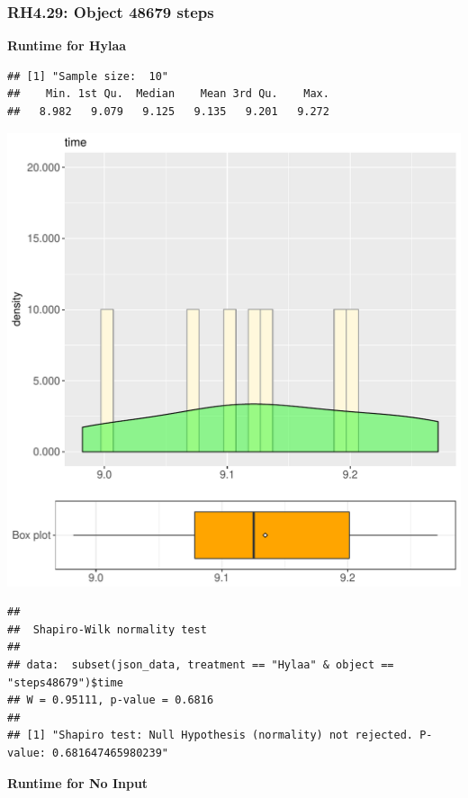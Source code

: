 \documentclass{article}\usepackage[]{graphicx}\usepackage[]{color}
\makeatletter
\def\maxwidth{ %
  \ifdim\Gin@nat@width>\linewidth
    \linewidth
  \else
    \Gin@nat@width
  \fi
}
\newenvironment{kframe}{%
 \def\at@end@of@kframe{}%
 \ifinner\ifhmode%
  \def\at@end@of@kframe{\end{minipage}}%
  \begin{minipage}{\columnwidth}%
 \fi\fi%
 \def\FrameCommand##1{\hskip\@totalleftmargin \hskip-\fboxsep
 \colorbox{shadecolor}{##1}\hskip-\fboxsep
     \hskip-\linewidth \hskip-\@totalleftmargin \hskip\columnwidth}%
 \MakeFramed {\advance\hsize-\width
   \@totalleftmargin\z@ \linewidth\hsize
   \@setminipage}}%
 {\par\unskip\endMakeFramed%
 \at@end@of@kframe}
\newenvironment{knitrout}{}{} %
\makeatother
\begin{document}
\subsubsection{RH4.29: Object 48679 steps}

 \textbf{Runtime for Hylaa}
\begin{knitrout}
\color{fgcolor}\begin{kframe}
\begin{verbatim}
## [1] "Sample size:  10"
##    Min. 1st Qu.  Median    Mean 3rd Qu.    Max. 
##   8.982   9.079   9.125   9.135   9.201   9.272
\end{verbatim}
\end{kframe}
\includegraphics[width=\maxwidth]{figure/RH4_Hylaa_steps48679-1} 
\begin{kframe}\begin{verbatim}
## 
## 	Shapiro-Wilk normality test
## 
## data:  subset(json_data, treatment == "Hylaa" & object == "steps48679")$time
## W = 0.95111, p-value = 0.6816
## 
## [1] "Shapiro test: Null Hypothesis (normality) not rejected. P-value: 0.681647465980239"
\end{verbatim}
\end{kframe}
\end{knitrout}
 \textbf{Runtime for No Input}
\end{document}
